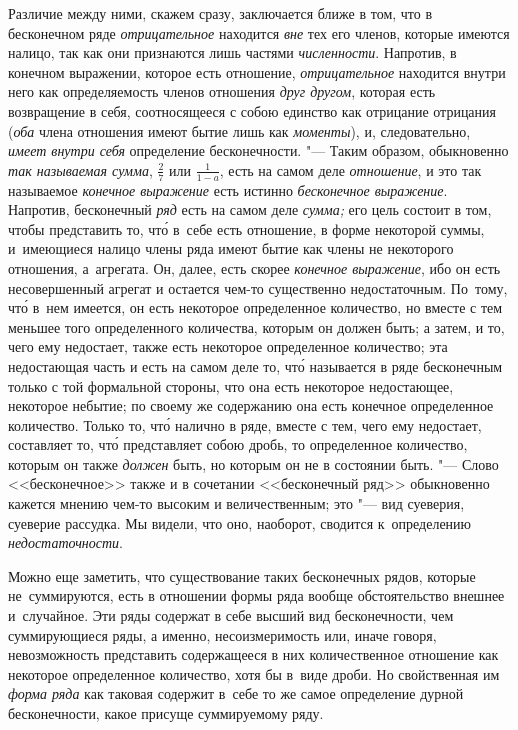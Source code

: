 Различие между ними, скажем сразу, заключается ближе в том, что в бесконечном
ряде {\em отрицательное} находится {\em вне} тех его членов, которые имеются
налицо, так как они признаются лишь частями {\em численности}. Напротив, в
конечном выражении, которое есть отношение, {\em отрицательное} находится
внутри него как определяемость членов отношения {\em друг другом}, которая есть
возвращение в себя, соотносящееся с собою единство как отрицание отрицания
({\em оба} члена отношения имеют бытие лишь как {\em моменты}), и,
следовательно, {\em имеет внутри себя} определение бесконечности. "--- Таким
образом, обыкновенно {\em так называемая сумма}, $\frac 2 7$ или
$\frac 1{1-a}$, есть на самом деле {\em отношение}, и это так называемое
{\em конечное выражение} есть истинно {\em бесконечное выражение}. Напротив,
бесконечный {\em ряд} есть на самом деле {\em сумма;} его цель состоит в том,
чтобы представить то, чт\'{о} в~себе есть отношение, в форме некоторой суммы,
и~имеющиеся налицо члены ряда имеют бытие как члены не некоторого отношения,
а~агрегата. Он, далее, есть скорее {\em конечное выражение}, ибо он есть
несовершенный агрегат и остается чем-то существенно недостаточным. По~тому,
чт\'{о} в~нем имеется, он есть некоторое определенное количество, но вместе
с тем меньшее того определенного количества, которым он должен быть; а затем,
и то, чего ему недостает, также есть некоторое определенное количество; эта
недостающая часть и есть на самом деле то, чт\'{о} называется в ряде
бесконечным только с той формальной стороны, что она есть некоторое
недостающее, некоторое небытие; по своему же содержанию она есть конечное
определенное количество. Только то, чт\'{о} налично в ряде, вместе с тем, чего
ему недостает, составляет то, чт\'{о} представляет собою дробь, то определенное
количество, которым он также {\em должен} быть, но которым он не в состоянии
быть. "--- Слово <<бесконечное>> также и в сочетании <<бесконечный ряд>>
обыкновенно кажется мнению чем-то высоким и величественным; это "--- вид
суеверия, суеверие рассудка. Мы видели, что оно, наоборот, сводится
к~определению {\em недостаточности}.

Можно еще заметить, что существование таких бесконечных рядов, которые
не~суммируются, есть в отношении формы ряда вообще обстоятельство внешнее
и~случайное. Эти ряды содержат в себе высший вид бесконечности, чем
суммирующиеся ряды, а именно, несоизмеримость или, иначе говоря, невозможность
представить содержащееся в них количественное отношение как некоторое
определенное количество, хотя бы в~виде дроби. Но свойственная им
{\em форма ряда} как таковая содержит в~себе то же самое определение дурной
бесконечности, какое присуще суммируемому ряду.

